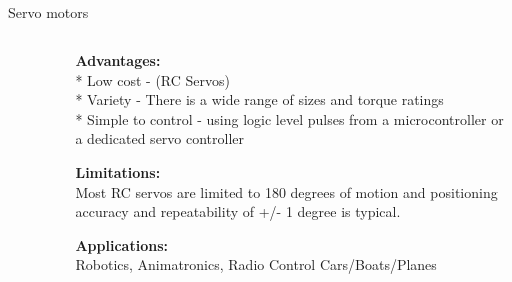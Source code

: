 \subsection{}
{
\begin{frame}{Servo motors}

\begin{columns}
\begin{column}{0.45\textwidth}  %

	\vspace{-3mm}
   	\begin{figure}
 	\end{figure}

\end{column}

\begin{column}{0.55\textwidth}

{\bf Advantages:} \\
* Low cost - (RC Servos) \\
* Variety - There is a wide range of sizes and torque ratings \\
* Simple to control - using logic level pulses from a microcontroller or a dedicated servo controller

{\bf Limitations:} \\
 Most RC servos are limited to 180 degrees of motion and positioning accuracy and repeatability of +/- 1 degree is typical.


{\bf Applications:} \\
Robotics,
Animatronics, 
Radio Control Cars/Boats/Planes



\end{column}
\end{columns}
\end{frame}
}




